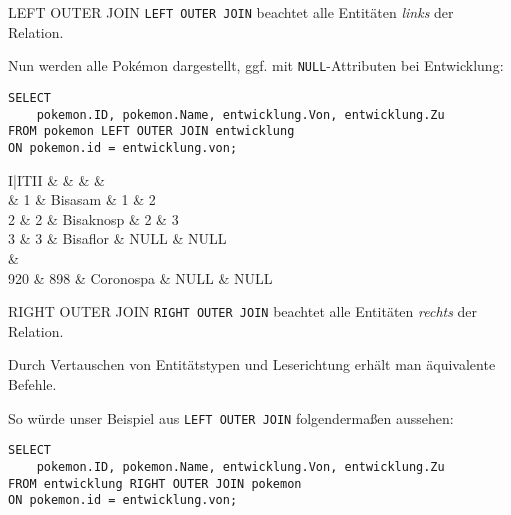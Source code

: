 \begin{sql}{LEFT OUTER JOIN}
    \texttt{LEFT OUTER JOIN} beachtet alle Entitäten \emph{links} der Relation.

    Nun werden alle Pokémon dargestellt, ggf. mit \texttt{NULL}-Attributen bei Entwicklung:

    \begin{verbatim}
SELECT
    pokemon.ID, pokemon.Name, entwicklung.Von, entwicklung.Zu
FROM pokemon LEFT OUTER JOIN entwicklung
ON pokemon.id = entwicklung.von;
    \end{verbatim}

    \begin{tabular}{I|ITII}
        &  &  &  &  \\ & 1 & Bisasam & 1 & 2 \\
        2 & 2 & Bisaknosp & 2 & 3 \\
        3 & 3 & Bisaflor & NULL & NULL \\
         &  \\
        920 & 898 & Coronospa & NULL & NULL \\
    \end{tabular}
\end{sql}

\begin{sql}{RIGHT OUTER JOIN}
    \texttt{RIGHT OUTER JOIN} beachtet alle Entitäten \emph{rechts} der Relation.

    Durch Vertauschen von Entitätstypen und Leserichtung erhält man äquivalente Befehle.

    So würde unser Beispiel aus \texttt{LEFT OUTER JOIN} folgendermaßen aussehen:

    \begin{verbatim}
SELECT
    pokemon.ID, pokemon.Name, entwicklung.Von, entwicklung.Zu
FROM entwicklung RIGHT OUTER JOIN pokemon
ON pokemon.id = entwicklung.von;
    \end{verbatim}
\end{sql}

